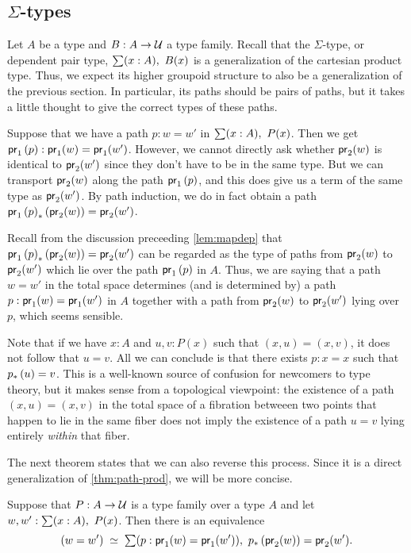 \subsection{$\Sigma$-types}
\label{sec:compute-sigma}

Let $A$ be a type and $B:A\to\mathcal{U}$ a type family.
Recall that the $\Sigma$-type, or dependent pair type, $\sm{x:A} B(x)$ is a generalization of the cartesian product type.
Thus, we expect its higher groupoid structure to also be a generalization of the previous section.
In particular, its paths should be pairs of paths, but it takes a little thought to give the correct types of these paths.

Suppose that we have a path $p:w=w'$ in $\sm{x:A}P(x)$.
Then we get ${\mathsf{pr}_{1}}\left({p}\right):\mathsf{pr}_{1}(w)=\mathsf{pr}_{1}(w')$.
However, we cannot directly ask whether $\mathsf{pr}_{2}(w)$ is identical to $\mathsf{pr}_{2}(w')$ since they don't have to be in the same type.
But we can transport $\mathsf{pr}_{2}(w)$ along the path ${\mathsf{pr}_{1}}\left({p}\right)$, and this does give us a term of the same type as $\mathsf{pr}_{2}(w')$.
By path induction, we do in fact obtain a path ${{\mathsf{pr}_{1}}\left({p}\right)}_{*}\left({\mathsf{pr}_{2}(w)}\right)=\mathsf{pr}_{2}(w')$.

Recall from the discussion preceeding \autoref{lem:mapdep} that ${{\mathsf{pr}_{1}}\left({p}\right)}_{*}\left({\mathsf{pr}_{2}(w)}\right)=\mathsf{pr}_{2}(w')$ can be regarded as the type of paths from $\mathsf{pr}_{2}(w)$ to $\mathsf{pr}_{2}(w')$ which lie over the path ${\mathsf{pr}_{1}}\left({p}\right)$ in $A$.
Thus, we are saying that a path $w=w'$ in the total space determines (and is determined by) a path $p:\mathsf{pr}_{1}(w)=\mathsf{pr}_{1}(w')$ in $A$ together with a path from $\mathsf{pr}_{2}(w)$ to $\mathsf{pr}_{2}(w')$ lying over $p$, which seems sensible.

\begin{rmk}
  Note that if we have $x:A$ and $u,v:P(x)$ such that $(x,u)=(x,v)$, it does not follow that $u=v$.
  All we can conclude is that there exists $p:x=x$ such that ${p}_{*}\left({u}\right) = v$.
  This is a well-known source of confusion for newcomers to type theory, but it makes sense from a topological viewpoint: the existence of a path $(x,u)=(x,v)$ in the total space of a fibration betweeen two points that happen to lie in the same fiber does not imply the existence of a path $u=v$ lying entirely \emph{within} that fiber.
\end{rmk}

The next theorem states that we can also reverse this process.
Since it is a direct generalization of \autoref{thm:path-prod}, we will be more concise.

\begin{thm}\label{thm:path-sigma}
Suppose that $P:A\to\mathcal{U}$ is a type family over a type $A$ and let $w,w^\prime:\sm{x:A}P(x)$. Then there is an equivalence
\begin{equation*}
\eqvspaced{(w=w')}{\sm{p:\proj{1}(w)=\proj{1}(w')}\trans{p}{\proj{2}(w)}=\proj{2}(w^\prime)}.
\end{equation*}
\end{thm}

